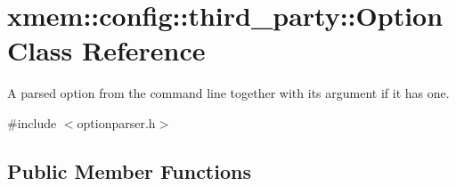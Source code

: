 \hypertarget{classxmem_1_1config_1_1third__party_1_1_option}{}\section{xmem\+:\+:config\+:\+:third\+\_\+party\+:\+:Option Class Reference}
\label{classxmem_1_1config_1_1third__party_1_1_option}


A parsed option from the command line together with its argument if it has one.  




{\ttfamily \#include $<$optionparser.\+h$>$}

\subsection*{Public Member Functions}
